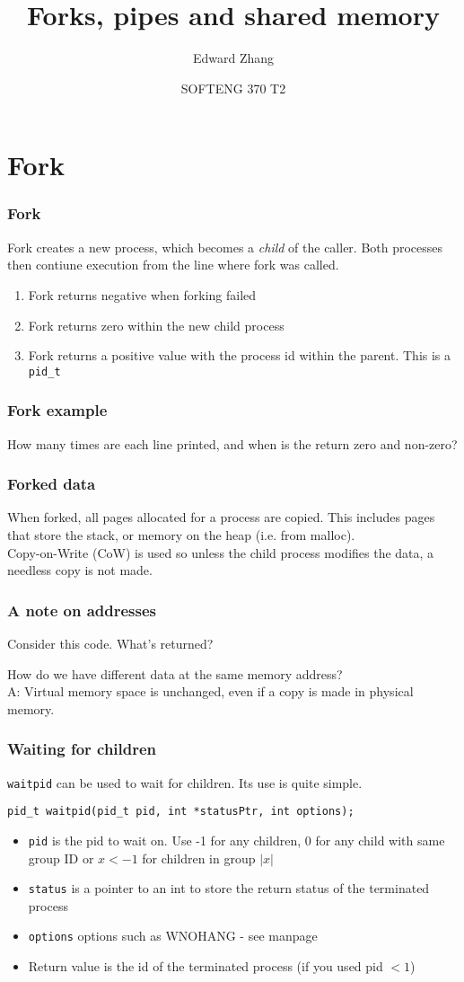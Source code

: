 \documentclass{beamer}
\title[SOFTENG 370 Tutorial 2 (2019)] %
{Forks, pipes and shared memory}
\author{Edward Zhang}
\date[August 2019] %
{SOFTENG 370 T2}
\begin{document}
\frame{\titlepage}
\section{Fork}
\begin{frame}
  \frametitle{Fork}
  Fork creates a new process, which becomes a \emph{child} of the caller. Both processes then contiune execution from the line where fork was called.
  \begin{enumerate}
    \item Fork returns negative when forking failed
    \item Fork returns zero within the new child process
    \item Fork returns a positive value with the process id within the parent. This is a \texttt{pid\_t}
  \end{enumerate}
\end{frame}
\begin{frame}
  \frametitle{Fork example}
  
  How many times are each line printed, and when is the return zero and non-zero?
\end{frame}
\begin{frame}
  \frametitle{Forked data}
  When forked, all pages allocated for a process are copied. This includes pages that store the stack, or memory on the heap (i.e. from malloc).\\
  Copy-on-Write (CoW) is used so unless the child process modifies the data, a needless copy is not made.

\end{frame}
\begin{frame}
  \frametitle{A note on addresses}
  Consider this code. What's returned?
  
  \pause
  How do we have different data at the same memory address?\\
  \pause
  A: Virtual memory space is unchanged, even if a copy is made in physical memory.
\end{frame}
\begin{frame}[fragile]
  \frametitle{Waiting for children}
  \texttt{waitpid} can be used to wait for children. Its use is quite simple.
  \begin{lstlisting}[style=customcbig]
    pid_t waitpid(pid_t pid, int *statusPtr, int options);
  \end{lstlisting}
  \begin{itemize}
    \item \texttt{pid} is the pid to wait on. Use -1 for any children, 0 for any child with same group ID or $x < -1$ for children in group $\lvert x\lvert$
    \item \texttt{status} is a pointer to an int to store the return status of the terminated process
    \item \texttt{options} options such as WNOHANG - see manpage
    \item Return value is the id of the terminated process (if you used pid $<1$)
  \end{itemize}
  

\end{frame}
\end{document}
